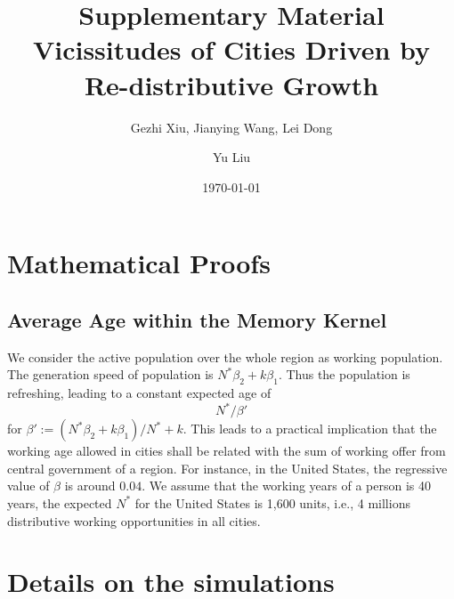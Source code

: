 \documentclass[aps,prl]{revtex4-2}
\begin{document}
\title{Supplementary Material\\Vicissitudes of Cities Driven by Re-distributive Growth}
\date{\today}
\author{Gezhi Xiu, Jianying Wang, Lei Dong}

\author{Yu Liu}

\pacs{} 



\maketitle
\tableofcontents
\vspace{1cm}

\section{Mathematical Proofs}

\subsection{Average Age within the Memory Kernel}

We consider the active population over the whole region as working population. The generation speed of population is $N^*\beta_2 + k\beta_1$. Thus the population is refreshing, leading to a constant expected age of \[N^*/\beta'\] for $\beta' := (N^*\beta_2 + k\beta_1)/N^*+k$. This leads to a practical implication that the working age allowed in cities shall be related with the sum of working offer from central government of a region. For instance, in the United States, the regressive value of $\beta$ is around $0.04$. We assume that the working years of a person is 40 years, the expected $N^*$ for the United States is 1,600 units, i.e., 4 millions distributive working opportunities in all cities.


\section{Details on the simulations}
\end{document}
